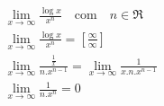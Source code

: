 \begin{ex}
\begin{align}
&\lim_{x\rightarrow \infty} \frac{\log{x}}{x^{n}}\quad\text{com}\quad n\in\Re\nonumber\\
&\lim_{x\rightarrow \infty} \frac{\log{x}}{x^{n}}=\left[\frac{\infty}{\infty}\right]\nonumber\\
&\lim_{x\rightarrow \infty} \frac{\frac{1}{x}}{n.x^{n-1}}=\lim_{x\rightarrow \infty} \frac{1}{x.n.x^{n-1}}\nonumber\\
&\lim_{x\rightarrow \infty} \frac{1}{n.x^{n}}=0\nonumber
\end{align}
\end{ex}